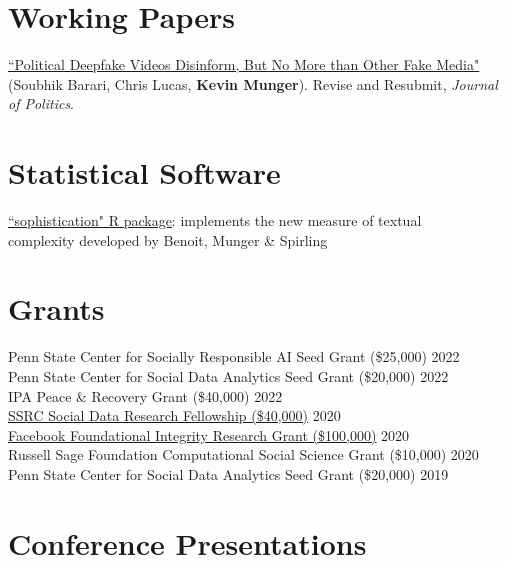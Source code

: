 \documentclass[margin]{res}
\begin{document}
{\section{Working Papers}


\href{https://osf.io/cdfh3/}{``Political Deepfake Videos Disinform, But No More than Other Fake Media"} (Soubhik Barari, Chris Lucas, \textbf{Kevin Munger}). Revise and Resubmit, \textit{Journal of Politics}.










\section{Statistical Software}
\href{https://github.com/kbenoit/sophistication}{``sophistication" R package}: implements the new measure of textual \\complexity developed by Benoit, Munger \& Spirling

\section{Grants}
Penn State Center for Socially Responsible AI Seed Grant  (\$25,000)  \hfill 2022 \\
Penn State Center for Social Data Analytics Seed Grant  (\$20,000)  \hfill 2022 \\
{IPA Peace \& Recovery Grant (\$40,000)}  \hfill 2022\\
\href{https://www.ssrc.org/fellowships/view/social-data-research-and-dissertation-fellowships/grantees/munger/}{SSRC Social Data Research Fellowship (\$40,000)}  \hfill 2020\\
\href{https://research.fb.com/programs/research-awards/proposals/foundational-integrity-research-misinformation-and-polarization-request-for-proposals/}{Facebook Foundational Integrity Research Grant (\$100,000)}  \hfill 2020\\
Russell Sage Foundation Computational Social Science Grant  (\$10,000)  \hfill 2020\\
Penn State Center for Social Data Analytics Seed Grant  (\$20,000)  \hfill 2019 \\




\section{Conference Presentations}

}
\end{document}
